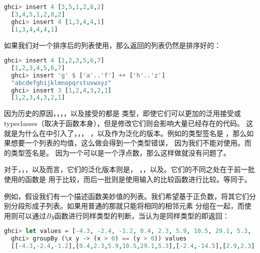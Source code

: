 \documentclass[./main.tex]{subfiles}
\begin{document}
\begin{lstlisting}[language=Haskell]
  ghci> insert 4 [3,5,1,2,8,2]
  [3,4,5,1,2,8,2]
  ghci> insert 4 [1,3,4,4,1]
  [1,3,4,4,4,1]
\end{lstlisting}

如果我们对一个排序后的列表使用，那么返回的列表仍然是排序好的：

\begin{lstlisting}[language=Haskell]
  ghci> insert 4 [1,2,3,5,6,7]
  [1,2,3,4,5,6,7]
  ghci> insert 'g' $ ['a'..'f'] ++ ['h'..'z']
  "abcdefghijklmnopqrstuvwxyz"
  ghci> insert 3 [1,2,4,3,2,1]
  [1,2,3,4,3,2,1]
\end{lstlisting}

因为历史的原因，，，，\acode{!!}以及接受的都是
类型，即使它们可以更加的泛用接受或 typeclasses（取决于函数本身），但是修改它们则会影响大量已经存在的代码。
这就是为什么在中引入了，，，
，以及作为泛化的版本。例如的类型签名是
，那么如果想要一个列表的均值，这么做会得到一个类型错误，
因为我们不能对使用\acode{/}。而的类型签名是。
因为一个可以是一个浮点数，那么这样做就没有问题了。

对于，，，以及而言，它们的泛化版本则是，
，，以及。它们的不同之处在于前一批使用的函数是
\acode{==}用于比较，而后一批则是使用输入的比较函数进行比较。等同于。

例如，假设我们有一个描述函数美妙值的列表。我们希望基于正负数，将其它们分别分段形成子列表。如果用普通的那就只能将相同的相邻元素
分组在一起，而使用则可以通过\textit{By}函数进行同样类型的判断，当认为是同样类型的即返回：

\begin{lstlisting}[language=Haskell]
  ghci> let values = [-4.3, -2.4, -1.2, 0.4, 2.3, 5.9, 10.5, 29.1, 5.3, -2.4, -14.5, 2.9, 2.3]
  ghci> groupBy (\x y -> (x > 0) == (y > 0)) values
  [[-4.3,-2.4,-1.2],[0.4,2.3,5.9,10.5,29.1,5.3],[-2.4,-14.5],[2.9,2.3]]
\end{lstlisting}
\end{document}

